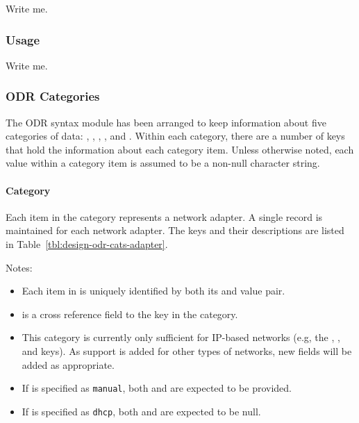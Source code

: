 Write me.

\subsubsection{ Usage}

Write me.

\subsubsection{ODR Categories}

The ODR syntax module has been arranged to keep information about five
categories of data: , ,
, , and 
. Within each category, there are a number of keys 
that hold the information about each category item. Unless otherwise
noted, each value within a category item is assumed to be a non-null
character string.


\paragraph{ Category}

Each item in the  category represents a network
adapter. A single record is maintained for each network adapter.  The
keys and their descriptions are listed in
Table~\ref{tbl:design-odr-cats-adapter}.

Notes:

\begin{itemize}
\item Each item in  is uniquely identified by 
both its  and  value pair.

\item {} is a cross reference field to the 
  key in the  category.
  
\item This category is currently only sufficient for IP-based networks
  (e.g, the , , and
   keys).  As support is added for other types of
  networks, new fields will be added as appropriate.

\item If  is specified as {\tt manual}, both 
   and  are expected to be
   provided.

\item If  is specified as {\tt dhcp}, both 
   and  are expected to be
   null.
\end{itemize}

